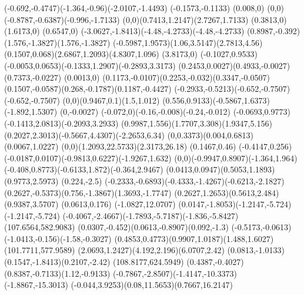 {    \rcurveto(-0.692,-0.4747)(-1.364,-0.96)(-2.0107,-1.4493)
    \rlineto(-0.1573,-0.1133)
    \rlineto(0.008,0)
    \rcurveto(0,0)(-0.8787,-0.6387)(-0.996,-1.7133)
    \rcurveto(0,0)(0.7413,1.2147)(2.7267,1.7133)
    \rlineto(0.3813,0)
    \rlineto(1.6173,0)
    \rlineto(0.6547,0)
    \rcurveto(-3.0627,-1.8413)(-4.48,-4.2733)(-4.48,-4.2733)
    \rcurveto(0.8987,-0.392)(1.576,-1.3827)(1.576,-1.3827)
    \rcurveto(-0.5987,1.9573)(1.06,3.5147)(2.7813,4.56)
    \rcurveto(0.1507,0.068)(2.6867,1.2093)(4.8307,1.096)
    \rlineto(3.8173,0)
    \rlineto(-0.1027,0.9533)
    \rcurveto(-0.0053,0.0653)(-0.1333,1.2907)(-0.2893,3.3173)
    \rcurveto(0.2453,0.0027)(0.4933,-0.0027)(0.7373,-0.0227)
    \rlineto(0.0013,0)
    \rcurveto(0.1173,-0.0107)(0.2253,-0.032)(0.3347,-0.0507)
    \rcurveto(0.1507,-0.0587)(0.268,-0.1787)(0.1187,-0.4427)
    \rcurveto(-0.2933,-0.5213)(-0.652,-0.7507)(-0.652,-0.7507)
    \rcurveto(0,0)(0.9467,0.1)(1.5,1.012)
    \rcurveto(0.556,0.9133)(-0.5867,1.6373)(-1.892,1.5307)
    \rlineto(0,-0.0027)
    \rcurveto(-0.072,0)(-0.16,-0.008)(-0.24,-0.012)
    \rcurveto(-0.0693,0.9773)(-0.1413,2.0813)(-0.2093,3.2933)
    \rcurveto(0.9987,1.556)(1.7707,3.308)(1.9347,5.156)
    \rcurveto(0.2027,2.3013)(-0.5667,4.4307)(-2.2653,6.34)
    \rcurveto(0,0.3373)(0.004,0.6813)(0.0067,1.0227)
    \rcurveto(0,0)(1.2093,22.5733)(2.3173,26.18)
    \rlineto(0.1467,0.46)
    \rlineto(-0.4147,0.256)
    \rcurveto(-0.0187,0.0107)(-0.9813,0.6227)(-1.9267,1.632)
    \rcurveto(0,0)(-0.9947,0.8907)(-1.364,1.964)
    \rcurveto(-0.408,0.8773)(-0.6133,1.872)(-0.364,2.9467)
    \rcurveto(0.0413,0.0947)(0.5053,1.1893)(0.9773,2.5973)
    \rlineto(0.224,-2.5)
    \rcurveto(-0.2333,-0.6893)(-0.4333,-1.4267)(-0.6213,-2.1827)
    \rcurveto(0.2627,-0.5373)(0.756,-1.3867)(1.3693,-1.7747)
    \rcurveto(0.2627,1.2653)(0.5613,2.484)(0.9387,3.5707)
    \rlineto(0.0613,0.176)
    \rlineto(-1.0827,12.0707)
    \rcurveto(0.0147,-1.8053)(-1.2147,-5.724)(-1.2147,-5.724)
    \rcurveto(-0.4067,-2.4667)(-1.7893,-5.7187)(-1.836,-5.8427)
    \moveto(107.6564,582.9083)
    \rcurveto(0.0307,-0.452)(0.0613,-0.8907)(0.092,-1.3)
    \rcurveto(-0.5173,-0.0613)(-1.0413,-0.156)(-1.58,-0.3027)
    \rcurveto(0.4853,0.4773)(0.9907,1.0187)(1.488,1.6027)
    \moveto(101.7711,577.9589)
    \rcurveto(2.0693,1.2427)(4.192,2.196)(6.0707,2.42)
    \rcurveto(0.0813,-1.0133)(0.1547,-1.8413)(0.2107,-2.42)
    \closepath
    \moveto(108.8177,624.5949)
    \rcurveto(0.4387,-0.4027)(0.8387,-0.7133)(1.12,-0.9133)
    \rcurveto(-0.7867,-2.8507)(-1.4147,-10.3373)(-1.8867,-15.3013)
    \rcurveto(-0.044,3.9253)(0.08,11.5653)(0.7667,16.2147)
}
